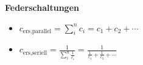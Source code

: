 \documentclass[10pt,a4paper,landscape, hidelinks]{article}
\begin{document}
\begin{multicols*}{3}
\vspace{20pt}

\textbf{Federschaltungen}
\begin{itemize}[leftmargin=*]
        \item [] $c_\text{ers,parallel}=\sum_{i}^{n}c_i=c_1+c_2+\cdots$
        \item [] $c_\text{ers,seriell}=\frac{1}{\sum_{i}^{n}\frac{1}{c_i}}=\frac{1}{\frac{1}{c_1}+\frac{1}{c_2}+\cdots}$
\end{itemize}

\par\vfill\null
\columnbreak





\end{multicols*}
\end{document}

